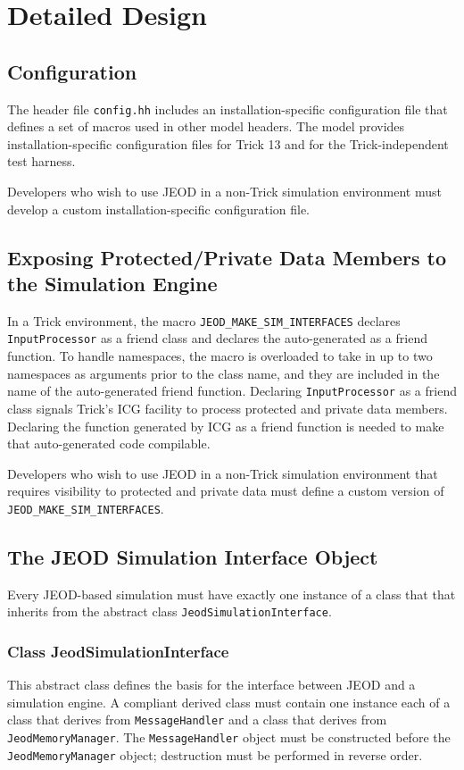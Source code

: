 \section{Detailed Design}

\subsection{Configuration}
The header file \verb|config.hh| includes an installation-specific
configuration file that defines a set of macros used in other model headers.
The model provides installation-specific configuration files for
Trick 13 and for the Trick-independent test harness.

Developers who wish to use JEOD in a non-Trick simulation environment
must develop a custom installation-specific configuration file.

\subsection{Exposing Protected/Private Data Members to the Simulation Engine}
In a Trick environment, the macro \verb|JEOD_MAKE_SIM_INTERFACES|
declares \verb|InputProcessor| as a friend class and declares the
auto-generated 
as a friend function. To handle namespaces, the macro is overloaded to take in
up to two namespaces as arguments prior to the class name, and they are included
in the name of the auto-generated friend function.
Declaring \verb|InputProcessor| as a friend class signals Trick's ICG facility
to process protected and private data members. Declaring the function
generated by ICG as a friend function is needed to make that auto-generated
code compilable.

Developers who wish to use JEOD in a non-Trick simulation environment
that requires visibility to protected and private data must define a
custom version of \verb|JEOD_MAKE_SIM_INTERFACES|.


\subsection{The JEOD Simulation Interface Object}
Every JEOD-based simulation must have exactly one instance of a class that
that inherits from the abstract class \verb|JeodSimulationInterface|.
\subsubsection{Class JeodSimulationInterface}
This abstract class defines the basis for the interface between JEOD and a
simulation engine. A compliant derived class must contain one instance each
of a class that derives from \verb|MessageHandler| and a class that derives from
\verb|JeodMemoryManager|. The \verb|MessageHandler| object must be constructed
before the \verb|JeodMemoryManager| object; destruction must be performed in
reverse order.


